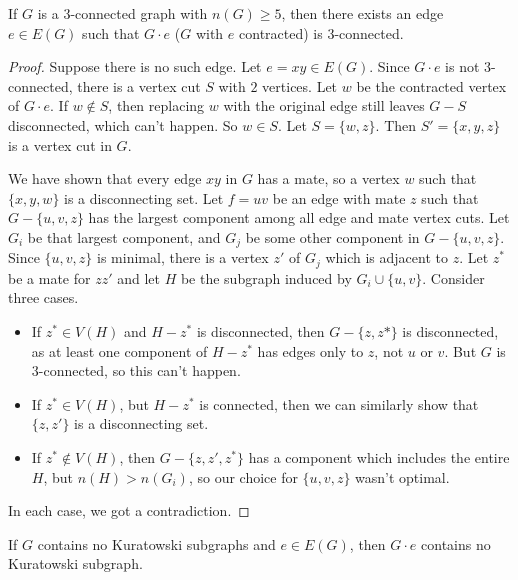 \begin{theorem}
  \label{theorem:tg-kuratowski-5}
  If $G$ is a $3$-connected graph with $n(G) \ge 5$, then there exists an edge
  $e \in E(G)$ such that $G \cdot e$ ($G$ with $e$ contracted) is $3$-connected.
\end{theorem}

\begin{proof}
  Suppose there is no such edge.
  Let $e = xy \in E(G)$.
  Since $G \cdot e$ is not $3$-connected, there is a vertex cut $S$ with $2$
  vertices.
  Let $w$ be the contracted vertex of $G \cdot e$.
  If $w \notin S$, then replacing $w$ with the original edge still leaves $G-S$
  disconnected, which can't happen.
  So $w \in S$.
  Let $S = \{w,z\}$.
  Then $S' = \{x,y,z\}$ is a vertex cut in $G$.

  We have shown that every edge $xy$ in $G$ has a mate, so a vertex $w$ such
  that $\{x,y,w\}$ is a disconnecting set.
  Let $f = uv$ be an edge with mate $z$ such that $G - \{u,v,z\}$ has the
  largest component among all edge and mate vertex cuts.
  Let $G_i$ be that largest component, and $G_j$ be some other component in $G -
  \{u,v,z\}$.
  Since $\{u,v,z\}$ is minimal, there is a vertex $z'$ of $G_j$ which is
  adjacent to $z$.
  Let $z^*$ be a mate for $zz'$ and let $H$ be the subgraph induced by $G_i \cup
  \{u,v\}$.
  Consider three cases.
  \begin{itemize}
  \item If $z^* \in V(H)$ and $H - z^*$ is disconnected, then $G - \{z,z*\}$ is
	disconnected, as at least one component of $H - z^*$ has edges only to $z$,
	not $u$ or $v$.
	But $G$ is $3$-connected, so this can't happen.
  \item If $z^* \in V(H)$, but $H - z^*$ is connected, then we can similarly
	show that $\{z,z'\}$ is a disconnecting set.
  \item If $z^* \notin V(H)$, then $G - \{z,z',z^*\}$ has a component which
	includes the entire $H$, but $n(H) > n(G_i)$, so our choice for $\{u,v,z\}$
	wasn't optimal.
  \end{itemize}
  In each case, we got a contradiction.
\end{proof}

\begin{lemma}
  \label{lemma:tg-kuratowski-6}
  If $G$ contains no Kuratowski subgraphs and $e \in E(G)$, then $G \cdot e$
  contains no Kuratowski subgraph.
\end{lemma}

